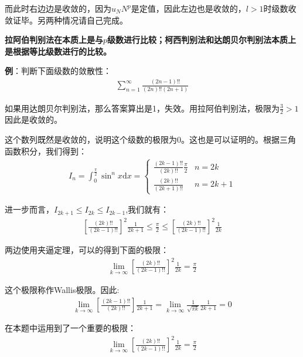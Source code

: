 \documentclass{ctexart}
\let\oldtextbf\textbf
\renewcommand{\textbf}[1]{\textcolor{brown!50!red}{\oldtextbf{#1}}}
\begin{document}
而此时右边边是收敛的，因为$u_NN^p$是定值，因此左边也是收敛的，$l>1$时级数收敛证毕。另两种情况请自己完成。

\textbf{\color{brown!50!red}拉阿伯判别法在本质上是与$p$级数进行比较；柯西判别法和达朗贝尔判别法本质上是根据等比级数进行的比较。}

\textbf{\color{brown!50!red}例}：判断下面级数的敛散性：
\begin{align*}
    \sum_{n=1}^\infty \frac{(2n-1)!!}{(2n)!!(2n+1)}
\end{align*}

如果用达朗贝尔判别法，那么答案算出是1，失效。用拉阿伯判别法，极限为$\frac{3}{2}>1$因此是收敛的。

这个数列既然是收敛的，说明这个级数的极限为0。这也是可以证明的。根据三角函数积分，我们得到：
\begin{align*}
  I_n=\int_0^{\frac{\pi}{2}}\sin^nx\mathrm{d}x=\begin{cases}
\frac{(2k-1)!!}{(2k)!!}\frac{\pi}{2}&n=2k\\
\frac{(2k)!!}{(2k+1)!!}&n=2k+1   
\end{cases}      
\end{align*}

进一步而言，$I_{2k+1}\leq I_{2k}\leq I_{2k-1}$,我们就有：
\begin{align*}
    \left[\frac{(2k)!!}{(2k-1)!!} \right]^2\frac{1}{2k+1}\leq\frac{\pi}{2}\leq 
     \left[\frac{(2k)!!}{(2k-1)!!} \right]^2\frac{1}{2k}
\end{align*}

两边使用夹逼定理，可以的得到下面的极限：
\begin{align*}
 \lim_{k\to\infty}\left[\frac{(2k)!!}{(2k-1)!!} \right]^2\frac{1}{2k}=\frac{\pi}{2}\tag{5-1}  
\end{align*}

这个极限称作Wallis极限。因此:
\begin{align*}
 \lim_{k\to\infty}\left[\frac{(2k-1)!!}{(2k)!!} \right]\frac{1}{2k+1}=\lim_{k\to\infty}
\frac{1}{\sqrt{\pi k}}  \frac{1}{2k+1}=0 
\end{align*}

\begin{tcolorbox}[
    colback=bac1,     %
    colframe=fra1,   %
    coltitle=white!80,    
    coltext=tex1,%
    title=Wallis极限,
    fonttitle=\bfseries,        %
arc=2mm,                     %
breakable
]
在本题中运用到了一个重要的极限：
\begin{align*}
    \lim_{k\to\infty}\left[\frac{(2k)!!}{(2k-1)!!} \right]^2\frac{1}{2k}=\frac{\pi}{2}
\end{align*}
\end{tcolorbox}
\end{document}
